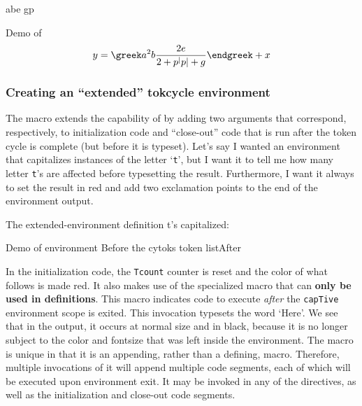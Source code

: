 \documentclass[10pt]{article}
\newcommand\TokCycle{\textsf{tokcycle}}
\begin{document}
\tcmapto a\alpha \tcmapto b\beta \tcmapto e\epsilon 
\tcmapto g\gamma \tcmapto p\pi

\begin{exampleA}[lefthand width=8.5cm]{Demo of }
\[
  y = 
  \greek a^2b\frac{2e}{2 + p^|p| + g}\endgreek 
  + x
\]
\end{exampleA}

\endgroup

\subsubsection{Creating an ``extended'' \TokCycle{} environment}

\begingroup
The  macro extends the capability of
   by adding two arguments that correspond,
  respectively, to initialization code and ``close-out'' code that is run 
  after the token cycle is complete (but before it is typeset).
Let's say I wanted an environment that capitalizes instances of the letter
  `\texttt{t}', but I want it to tell me how many
  letter \texttt{t}'s are affected before typesetting the result.
Furthermore, I want it always to set the result in red and add two  
  exclamation points to the end of the environment output.

\begin{exampleC}[]{The  extended-environment definition}
\xtokcycleenvironment\capTive%
{}%
{}%
{}%
{}%
{\setcounter{Tcount}{0}\color{red}}%
{\theTcount{} t's capitalized: \addcytoks{!!}}%
\end{exampleC}

\begin{exampleA}[lefthand width=7.9cm]{Demo of 
  environment}
Before \capTive the cytoks \footnotesize token list\endcapTive After
\end{exampleA}

In the initialization code, the \texttt{Tcount} counter is reset and the color
  of what follows is made red.
It also makes use of the specialized  macro that can
  \textbf{only be used in  definitions}.
This macro indicates code to execute \textit{after} the \texttt{capTive}
  environment scope is exited.
This invocation typesets the word `Here'.
We see that in the output, it occurs at normal size and in black, because
  it is no longer subject to the color and fontsize that was left inside
  the environment.
The  macro is unique in that it is an appending, rather
  than a defining, macro.
Therefore, multiple invocations of it will append multiple code segments,
  each of which will be executed upon environment exit.
It may be invoked in any of the directives, as well as the initialization and
  close-out code segments.
\end{document}
